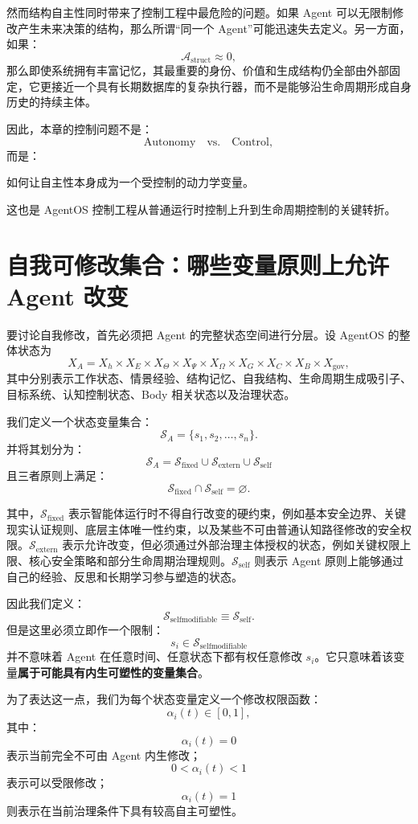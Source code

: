 然而结构自主性同时带来了控制工程中最危险的问题。如果 Agent 可以无限制修改产生未来决策的结构，那么所谓“同一个 Agent”可能迅速失去定义。另一方面，如果：
\[
\mathcal A_{\mathrm{struct}}
\approx 0,
\]
那么即使系统拥有丰富记忆，其最重要的身份、价值和生成结构仍全部由外部固定，它更接近一个具有长期数据库的复杂执行器，而不是能够沿生命周期形成自身历史的持续主体。

因此，本章的控制问题不是：
\[
\text{Autonomy}\quad \text{vs.}\quad \text{Control},
\]
而是：
\begin{statementbox}
如何让自主性本身成为一个受控制的动力学变量。
\end{statementbox}
这也是 AgentOS 控制工程从普通运行时控制上升到生命周期控制的关键转折。

\section{自我可修改集合：哪些变量原则上允许 Agent 改变}

要讨论自我修改，首先必须把 Agent 的完整状态空间进行分层。设 AgentOS 的整体状态为
\[
X_A
=
X_h
\times
X_E
\times
X_\Theta
\times
X_\Psi
\times
X_\Omega
\times
X_G
\times
X_C
\times
X_B
\times
X_{\mathrm{gov}},
\]
其中分别表示工作状态、情景经验、结构记忆、自我结构、生命周期生成吸引子、目标系统、认知控制状态、Body 相关状态以及治理状态。

我们定义一个状态变量集合：
\[
\mathcal S_A
=
\{s_1,s_2,\ldots,s_n\}.
\]
并将其划分为：
\[
\boxed{
\mathcal S_A
=
\mathcal S_{\mathrm{fixed}}
\cup
\mathcal S_{\mathrm{extern}}
\cup
\mathcal S_{\mathrm{self}}
}
\]
且三者原则上满足：
\[
\mathcal S_{\mathrm{fixed}}
\cap
\mathcal S_{\mathrm{self}}
=
\varnothing.
\]

其中，$\mathcal S_{\mathrm{fixed}}$ 表示智能体运行时不得自行改变的硬约束，例如基本安全边界、关键现实认证规则、底层主体唯一性约束，以及某些不可由普通认知路径修改的安全权限。$\mathcal S_{\mathrm{extern}}$ 表示允许改变，但必须通过外部治理主体授权的状态，例如关键权限上限、核心安全策略和部分生命周期治理规则。$\mathcal S_{\mathrm{self}}$ 则表示 Agent 原则上能够通过自己的经验、反思和长期学习参与塑造的状态。

因此我们定义：
\[
\boxed{
\mathcal S_{\mathrm{selfmodifiable}}
\equiv
\mathcal S_{\mathrm{self}}.
}
\]
但是这里必须立即作一个限制：
\[
s_i\in\mathcal S_{\mathrm{selfmodifiable}}
\]
并不意味着 Agent 在任意时间、任意状态下都有权任意修改 $s_i$。它只意味着该变量\textbf{属于可能具有内生可塑性的变量集合}。

为了表达这一点，我们为每个状态变量定义一个修改权限函数：
\[
\alpha_i(t)
\in
[0,1],
\]
其中：
\[
\alpha_i(t)=0
\]
表示当前完全不可由 Agent 内生修改；
\[
0<\alpha_i(t)<1
\]
表示可以受限修改；
\[
\alpha_i(t)=1
\]
则表示在当前治理条件下具有较高自主可塑性。

